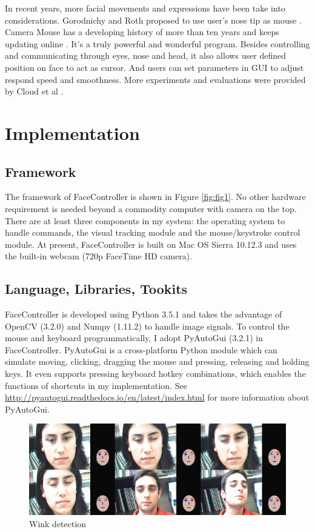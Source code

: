 \documentclass{sigchi}
\begin{document}
In recent years, more facial movements and expressions have been take into considerations.
Gorodnichy and Roth proposed to use user's nose tip as mouse \cite{gorodnichy2004nouse}.
Camera Mouse has a developing history of more than ten years and keeps updating online \cite{betke2002camera} \cite{gips2000camera}.
It's a truly powerful and wonderful program.
Besides controlling and communicating through eyes, nose and head, it also allows user defined position on face to act as cursor.
And users can set parameters in GUI to adjust respond speed and smoothness. 
More experiments and evaluations were provided by Cloud et al \cite{cloud2002experiments}.

\section{Implementation}

\subsection{Framework}
The framework of FaceController is shown in Figure \ref{fig:fig1}.
No other hardware requirement is needed beyond a commodity computer with camera on the top.
There are at least three components in my system: the operating system to handle commands, the visual tracking module and the mouse/keystroke control module.
At present, FaceController is built on Mac OS Sierra 10.12.3 and uses the built-in webcam (720p FaceTime HD camera).

\subsection{Language, Libraries, Tookits}
FaceController is developed using Python 3.5.1 and takes the advantage of OpenCV (3.2.0) and Numpy (1.11.2) to handle image signals.
To control the mouse and keyboard programmatically, I adopt PyAutoGui (3.2.1) in FaceController.
PyAutoGui is a cross-platform Python module which can simulate moving, clicking, dragging the mouse and pressing, releasing and holding keys.
It even supports pressing keyboard hotkey combinations, which enables the functions of shortcuts in my implementation.
See {\url {http://pyautogui.readthedocs.io/en/latest/index.html}} for more information about PyAutoGui.

\begin{figure}[h]
    \centering
    \includegraphics[width=1.8\columnwidth]{figures/winkdetection}
    \caption{Wink detection ~\protect\cite{varona2008hands}}
    \label{fig:fig3}
\end{figure}
\end{document}
